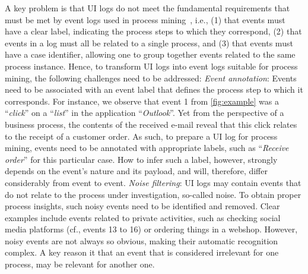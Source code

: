  A key problem is that UI logs do not meet the fundamental requirements that must be met by event logs used in process mining~\cite{van2016data}, i.e., (1) that events must have a clear label, indicating the process steps to which they correspond, (2) that events in a log must all be related to a single process, and (3) that events must have a case identifier, allowing one to group together events related to the same process instance. Hence, to transform UI logs into event logs suitable for process mining, the following challenges need to be addressed:
\vspace{0.2em}
\newline%
\textit{Event annotation}: Events need to be associated with an event label that defines the process step to which it corresponds. For instance, we observe that event 1 from \autoref{fig:example} was a ``\textit{click}'' on a ``\textit{list}'' in the application ``\textit{Outlook}''. Yet from the perspective of a business process, the contents of the received e-mail reveal that this click relates to the receipt of a customer order. As such, to prepare a UI log for process mining, events need to be annotated with appropriate labels, such as ``\emph{Receive order}'' for this particular case. How to infer such a label, however, strongly depends on the event's nature and its payload, and will, therefore, differ considerably from event to event.
\vspace{0.2em}
\newline%
\noindent \textit{Noise filtering}: 
UI logs may contain events that do not relate to the process under investigation, so-called noise. To obtain proper process insights, such noisy events need to be identified and removed. Clear examples include events related to private activities, such as checking social media platforms (cf., events 13 to 16) or ordering things in a webshop. 
However, noisy events are not always so obvious, making their automatic recognition complex.
A key reason it that an event that is considered irrelevant for one process, may be relevant for another one.
